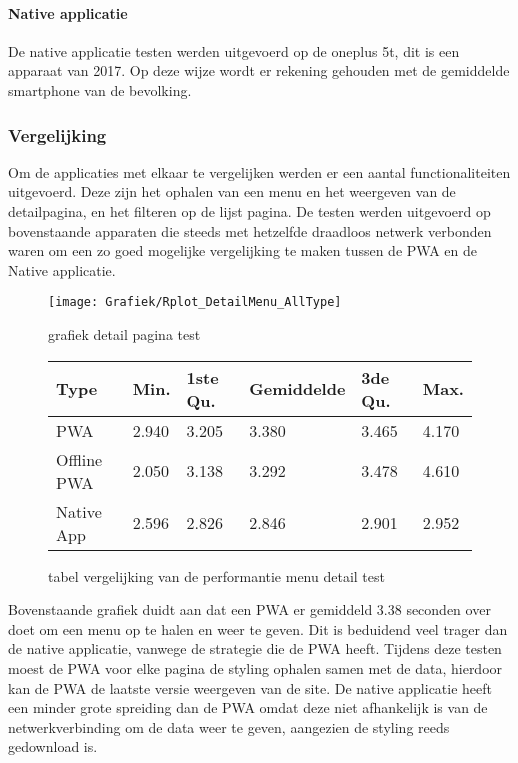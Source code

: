 \paragraph{Native applicatie}
De native applicatie testen werden uitgevoerd op de oneplus 5t, dit is een apparaat van 2017. Op deze wijze wordt er rekening gehouden met de gemiddelde smartphone van de bevolking.

\subsubsection{Vergelijking}
Om de applicaties met elkaar te vergelijken werden er een aantal functionaliteiten uitgevoerd. Deze zijn het ophalen van een menu en het weergeven van de detailpagina, en het filteren op de lijst pagina. De testen werden uitgevoerd op bovenstaande apparaten die steeds met hetzelfde draadloos netwerk verbonden waren om een zo goed mogelijke vergelijking te maken tussen de PWA en de Native applicatie.

\begin{figure}[H]
	\texttt{[image: Grafiek/Rplot\_DetailMenu\_AllType]}\centering
	\caption{grafiek detail pagina test}
\end{figure}

\begin{figure}[H]
	\begin{tabularx}{\textwidth }{|X|X|X|X|X|X|}
		\hline
		Type        & Min.  & 1ste Qu. & Gemiddelde & 3de Qu. & Max.  \\
		\hline
		PWA         & 2.940 & 3.205    & 3.380      & 3.465   & 4.170 \\
		\hline
		Offline PWA & 2.050 & 3.138    & 3.292      & 3.478   & 4.610 \\
		\hline
		Native App  & 2.596 & 2.826    & 2.846      & 2.901   & 2.952 \\
		\hline
	\end{tabularx}
	\caption{tabel vergelijking van de performantie menu detail test}
\end{figure}

Bovenstaande grafiek duidt aan dat een PWA er gemiddeld 3.38 seconden over doet om een menu op te halen en weer te geven. Dit is beduidend veel trager dan de native applicatie, vanwege de strategie die de PWA heeft. Tijdens deze testen moest de PWA voor elke pagina de styling ophalen samen met de data, hierdoor kan de PWA de laatste versie weergeven van de site. De native applicatie heeft een minder grote spreiding dan de PWA omdat deze niet afhankelijk is van de netwerkverbinding om de data weer te geven, aangezien de styling reeds gedownload is.

